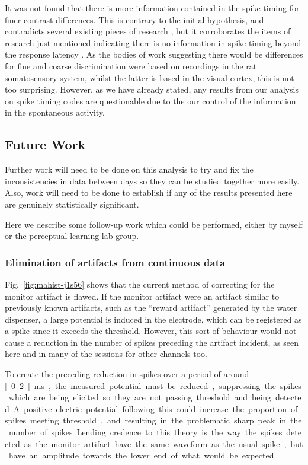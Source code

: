 It was not found that there is more information contained in the spike timing for finer contrast differences. This is contrary to the initial hypothesis, and contradicts several existing pieces of research \cite{Reich2001,Arabzadeh2006}, but it corroborates the items of research just mentioned indicating there is no information in spike-timing beyond the response latency \cite{Reich2001,Tovee1993,Rolls2011}.
As the bodies of work suggesting there would be differences for fine and coarse discrimination were based on recordings in the rat somatosensory system, whilst the latter is based in the visual cortex, this is not too surprising.
However, as we have already stated, any results from our analysis on spike timing codes are questionable due to the our control of the information in the spontaneous activity.

\subsection{Future Work}

Further work will need to be done on this analysis to try and fix the inconsistencies in data between days so they can be studied together more easily. Also, work will need to be done to establish if any of the results presented here are genuinely statistically significant.

Here we describe some follow-up work which could be performed, either by myself or the perceptual learning lab group.

\subsubsection{Elimination of artifacts from continuous data}

Fig.~\ref{fig:mahist-j1s56} shows that the current method of correcting for the monitor artifact is flawed.
If the monitor artifact were an artifact similar to previously known artifacts, such as the ``reward artifact'' generated by the water dispenser, a large potential is induced in the electrode, which can be registered as a spike since it exceeds the threshold. However, this sort of behaviour would not cause a reduction in the number of spikes preceding the artifact incident, as seen here and in many of the sessions for other channels too.

To create the preceding reduction in spikes over a period of around \unit[0.2]{ms}, the measured potential must be reduced, suppressing the spikes which are being elicited so they are not passing threshold and being detected.
A positive electric potential following this could increase the proportion of spikes meeting threshold, and resulting in the problematic sharp peak in the number of spikes.
Lending credence to this theory is the way the spikes detected as the monitor artifact have the same waveform as the usual spike, but have an amplitude towards the lower end of what would be expected.

